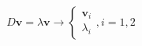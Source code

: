 \documentclass[preview]{standalone}
\begin{document}
\begin{align*}
D \bm v = \lambda \bm v \to \begin{cases} \bm v_i\\ \lambda_i \end{cases}, i=1,2
\end{align*}
\end{document}
